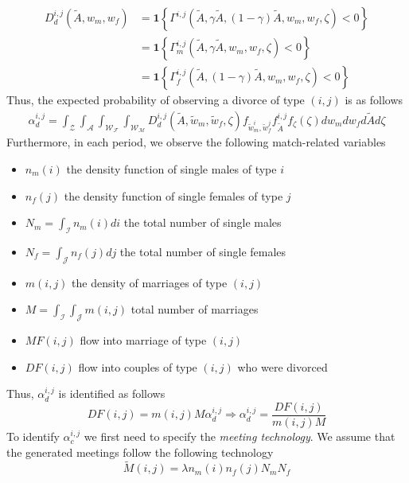 \begin{align}
D_d^{i,j}(\tilde A, w_m, w_f) &= \mathbf 1\left \{ \Gamma^{i,j}(\tilde A, \gamma \tilde A, (1-\gamma) \tilde A, w_m, w_f, \zeta) < 0\right \}  \label{D_c_2} \\
&= \mathbf 1\left \{ \Gamma_m^{i,j}(\tilde A, \gamma \tilde A, w_m, w_f, \zeta) < 0\right \}  \nonumber \\
&= \mathbf 1\left \{ \Gamma_f^{i,j}(\tilde A, (1 - \gamma) \tilde A, w_m, w_f, \zeta) < 0\right \}  \nonumber 
\end{align}
Thus, the expected probability of observing a divorce of type $(i,j)$ is as follows 
\begin{align*}
\alpha_d^{i,j} = \int_{\mathcal{Z}} \int_{\mathcal{A}}\int_{\mathcal{W_F}} \int_{\mathcal{W_M}} D_d^{i,j}(\tilde A, \tilde w_m, \tilde w_f, \zeta) f_{\tilde w^i_m, \tilde w^j_f} f_{\tilde A}^{i,j} f_{\zeta}(\zeta)dw_m dw_f d \tilde A d\zeta
\end{align*}
Furthermore, in each period, we observe the following match-related variables
\begin{itemize}
\item $n_m(i)$ the density function of single males of type $i$
\item $n_f(j)$ the density function of single females of type $j$
\item $N_m = \int_{\mathcal{I}}n_m(i) di$ the total number of single males 
\item $N_f = \int_{\mathcal{J}}n_f(j) dj$ the total number of single females 
\item $m(i,j)$ the density of marriages of type $(i,j)$
\item $M = \int_{\mathcal{I}} \int_{\mathcal{J}} m(i,j)$ total number of marriages 
\item $MF(i,j)$ flow into marriage of type $(i,j)$
\item $DF(i,j)$ flow into couples of type $(i,j)$ who were divorced 
\end{itemize}
Thus, $\alpha_{d}^{i,j}$ is identified as follows 
\begin{equation*}
DF(i,j) = m(i,j)M\alpha_{d}^{i,j} \Rightarrow \alpha_{d}^{i,j} = \dfrac{DF(i,j)}{m(i,j)M}
\end{equation*}
To identify $\alpha_{c}^{i,j}$ we first need to specify the \emph{meeting technology}. We assume that the generated meetings follow the following technology 
\begin{equation*}
\tilde M(i,j) = \lambda n_m(i)n_f(j) N_m N_f
\end{equation*}
